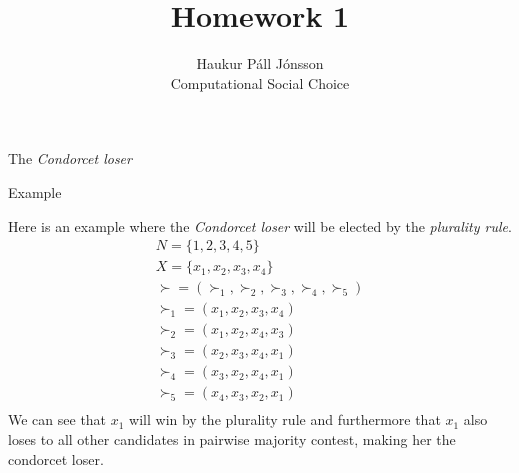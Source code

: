 \documentclass[12pt]{article}
\newenvironment{question}[2][Question]{\begin{trivlist}
\item[\hskip \labelsep {\bfseries #1}\hskip \labelsep {\bfseries #2.}]}{\end{trivlist}}
\newenvironment{answer}[2][Answer]{\begin{trivlist}
\item[\hskip \labelsep {\bfseries #1}\hskip \labelsep {\bfseries #2:}]}{\end{trivlist}}
\begin{document}
\renewcommand{\theenumi}{\roman{enumi}}

\let\oldsum\sum
\renewcommand{\sum}[3]{\oldsum\limits_{#1}^{#2}#3}
\let\oldprod\prod
\renewcommand{\prod}[3]{\oldprod\limits_{#1}^{#2}#3}

\newcommand\Dunion{
  \mathop{\mathchoice
    {\ooalign{$\displaystyle\bigcup$\cr\hss\scalebox{.65}{\raisebox{0.45ex}{\sffamily +}}\hss}}
    {\ooalign{$\textstyle\bigcup$\cr\hss\scalebox{.9}{\raisebox{0.5ex}{\tiny\sffamily +}}\hss}}
    {\ooalign{$\scriptstyle\bigcup$\cr\hss\scalebox{.45}{\raisebox{0.3ex}{\sffamily +}}\hss}}
    {\ooalign{$\scriptscriptstyle\bigcup$\cr\hss\scalebox{.38}{\raisebox{0.3ex}{\sffamily +}}\hss}}
    }
}

\title{Homework 1}
\author{Haukur Páll Jónsson\\
Computational Social Choice}

\maketitle

\begin{question}{1}

The \textit{Condorcet loser}
\end{question}

\begin{answer}{a)}{Example}

Here is an example where the \textit{Condorcet loser} will be elected by the \textit{plurality rule}.
\begin{align*}
N=\{1,2,3,4,5\} \\
X=\{x_1,x_2,x_3,x_4\} \\
\boldsymbol{\succ}=(\succ_1,\succ_2,\succ_3,\succ_4,\succ_5) \\
\succ_1=(x_1,x_2,x_3,x_4) \\
\succ_2=(x_1,x_2,x_4,x_3)\\
\succ_3=(x_2,x_3,x_4,x_1)\\
\succ_4=(x_3,x_2,x_4,x_1)\\
\succ_5=(x_4,x_3,x_2,x_1)\\
\end{align*}
We can see that $x_1$ will win by the plurality rule and furthermore that $x_1$ also loses to all other candidates in pairwise majority contest, making her the condorcet loser.
\end{answer}
\end{document}
